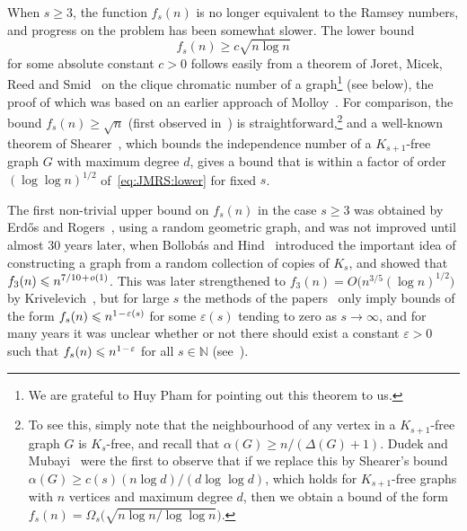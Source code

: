 \documentclass[12pt,reqno]{amsart}
\theoremstyle{remark}
\numberwithin{theorem}{section}
\renewcommand{\(}{\bigl(}
\renewcommand{\)}{\bigr)\vphantom{)}}
\newcommand{\p}{\hspace{0.02cm}+\hspace{0.02cm}}
\newcommand{\m}{\hspace{0.02cm}-\hspace{0.02cm}}
\newcommand{\eps}{\varepsilon}
\renewcommand{\le}{\leqslant}
\renewcommand{\ge}{\geqslant}
\newcommand{\N}{\mathbb N}
\begin{document}
When $s \ge 3$, the function $f_s(n)$ is no longer equivalent to the Ramsey numbers, and progress on the problem has been somewhat slower. The lower bound 
\begin{equation}\label{eq:JMRS:lower}
f_s(n) \ge c \sqrt{n \log n}
\end{equation}
for some absolute constant $c  > 0$ follows easily from a theorem of Joret, Micek, Reed and Smid~\cite{JMRS21} on the clique chromatic number of a graph\footnote{We are grateful to Huy Pham for pointing out this theorem to us.} (see below), the proof of which was based on an earlier approach of Molloy~\cite{Mol19}. For comparison, the bound $f_s(n) \ge \sqrt{n}$ (first observed in~\cite{BH91}) is straightforward,\footnote{To see this, simply note that the neighbourhood of any vertex in a $K_{s+1}$-free graph $G$ is $K_s$-free, and recall that $\alpha(G) \ge n / (\Delta(G) + 1)$. Dudek and Mubayi~\cite{DM14} were the first to observe that if we replace this by Shearer's bound $\alpha(G) \ge c(s) (n \log d) / (d \log \log d)$, which holds for $K_{s+1}$-free graphs with $n$ vertices and maximum degree $d$, then we obtain a bound of the form $f_s(n) = \Omega_s\big( \displaystyle{\sqrt{ n \log n / \log\log n}} \big)$.} and a well-known theorem of Shearer~\cite{S95}, which bounds the independence number of a $K_{s+1}$-free graph $G$ with maximum degree $d$, gives a bound that is within a factor of order $(\log\log n)^{1/2}$ of~\eqref{eq:JMRS:lower} for fixed $s$.

The first non-trivial upper bound on $f_s(n)$ in the case $s \ge 3$ was obtained by Erd\H{o}s and Rogers~\cite{ER62}, using a random geometric graph, and was not improved until almost 30 years later, when Bollobás and Hind~\cite{BH91} introduced the important idea of constructing a graph from a random collection of copies of $K_s$, and showed that $f_3(n) \le n^{7/10 \p o(1)}$. This was later strengthened to $f_3(n) = O\big( n^{3/5} (\log n)^{1/2} \big)$ by Krivelevich~\cite{Kr94,Kr95}, but for large $s$ the methods of the papers~\cite{ER62,BH91,Kr94,Kr95} only imply bounds of the form $f_s(n) \le n^{1 \m \eps(s)}$ for some $\eps(s)$ tending to zero as $s \to \infty$, and for many years it was unclear whether or not there should exist a constant $\eps > 0$ such that $f_s(n) \le n^{1 \m \eps}$ for all $s \in \N$ (see~\cite{Kr95,Su05b}). 

\end{document}
